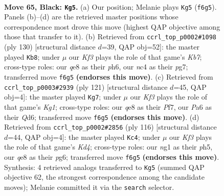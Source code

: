\documentclass[11pt]{article}
\begin{document}
\clearpage

\begin{figure}[p]\centering
\begin{subfigure}{0.46\textwidth}\centering
\resizebox{\linewidth}{!}{%
\newchessgame
\chessboard[
  setfen={4Q3/8/p4k2/3P3p/2N3p1/8/5Q2/5KN1 b - - 0 65},
  showmover=false,
  pgfstyle=straightmove, color=movearrow, markmove={f6-g5}
]}
\caption{}
\end{subfigure}\hfill
\begin{subfigure}{0.46\textwidth}\centering
\resizebox{\linewidth}{!}{%
\newchessgame
\chessboard[
  setfen={Q7/1K4p1/7p/7P/4qk2/1P6/6P1/8 w - - 1 66},
  showmover=false,
  pgfstyle=straightmove, color=movearrow, markmove={b7-b8}
]}
\caption{}
\end{subfigure}
\\[4pt]
\begin{subfigure}{0.46\textwidth}\centering
\resizebox{\linewidth}{!}{%
\newchessgame
\chessboard[
  setfen={6k1/5p2/3q2p1/8/6PP/5Q2/6K1/8 b - - 8 61},
  showmover=false,
  pgfstyle=straightmove, color=movearrow, markmove={g8-g7}
]}
\caption{}
\end{subfigure}\hfill
\begin{subfigure}{0.46\textwidth}\centering
\resizebox{\linewidth}{!}{%
\newchessgame
\chessboard[
  setfen={5qk1/Q7/6p1/7p/3K3P/6P1/5P2/8 w - - 23 59},
  showmover=false,
  pgfstyle=straightmove, color=movearrow, markmove={d4-c4}
]}
\caption{}
\end{subfigure}
\caption{\textbf{Move 65, Black: \texttt{Kg5}.} (a) Our position; Melanie plays \texttt{Kg5} (\texttt{f6g5}). Panels (b)--(d) are the retrieved master positions whose correspondence most drove this move (highest QAP objective among those that transfer to it). (b) Retrieved from \texttt{ccrl\_top\_p0002\#1098} (ply 130) [structural distance $d$=39, QAP obj=52]: the master played \texttt{Kb8}; under $\mu$ our \emph{Kf3} plays the role of that game's \emph{Kb7}; cross-type roles: our \emph{q}e8 as their \emph{p}h6, our \emph{n}c4 as their \emph{p}g7; transferred move \texttt{f6g5} \textbf{(endorses this move)}. (c) Retrieved from \texttt{ccrl\_top\_p0003\#2939} (ply 121) [structural distance $d$=45, QAP obj=4]: the master played \texttt{Kg7}; under $\mu$ our \emph{Kf3} plays the role of that game's \emph{Kg1}; cross-type roles: our \emph{q}e8 as their \emph{P}f7, our \emph{P}a6 as their \emph{Q}d6; transferred move \texttt{f6g5} \textbf{(endorses this move)}. (d) Retrieved from \texttt{ccrl\_top\_p0002\#2856} (ply 116) [structural distance $d$=44, QAP obj=4]: the master played \texttt{Kc4}; under $\mu$ our \emph{Kf3} plays the role of that game's \emph{Kd4}; cross-type roles: our \emph{n}g1 as their \emph{p}h5, our \emph{q}e8 as their \emph{p}g6; transferred move \texttt{f6g5} \textbf{(endorses this move)}. Synthesis: 4 retrieved analogs transferred to \texttt{Kg5} (summed QAP objective 62, the strongest correspondence among the candidate moves); Melanie committed it via the \texttt{search} selector.}
\label{fig:thought-m129}
\end{figure}
\end{document}
